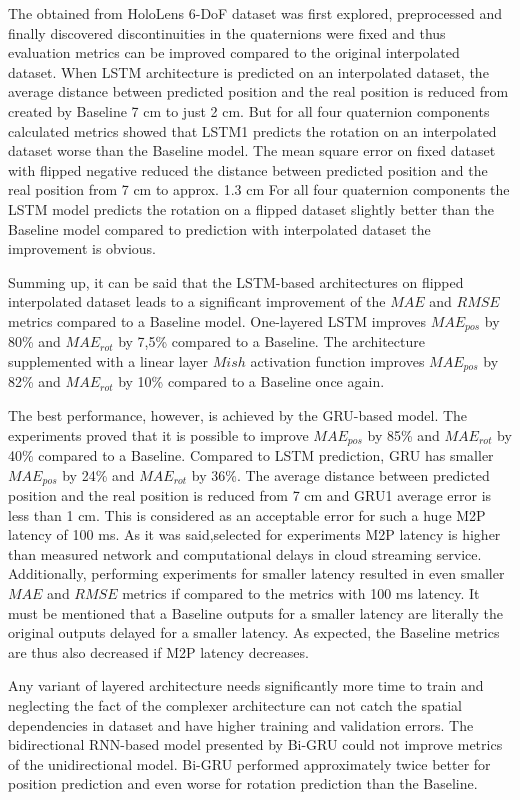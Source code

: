 The obtained from HoloLens 6-DoF dataset was first explored, preprocessed and finally discovered discontinuities in the quaternions were fixed and thus evaluation metrics can be improved compared to the original interpolated dataset. When LSTM architecture is predicted on an interpolated dataset, the average distance between predicted position and the real position is reduced from created by Baseline 7 cm to just 2 cm. But for all four quaternion components calculated metrics showed that LSTM1 predicts the rotation on an interpolated dataset worse than the Baseline model. The mean square error on fixed dataset with flipped negative reduced the distance between predicted position and the real position from 7 cm to approx. 1.3 cm For all four quaternion components the LSTM model predicts the rotation on a flipped dataset slightly better than the Baseline model compared to prediction with interpolated dataset the improvement is obvious. 

Summing up, it can be said that the LSTM-based architectures on flipped interpolated dataset leads to a significant improvement of the $MAE$ and $RMSE$ metrics compared to a Baseline model. One-layered LSTM improves $MAE_{pos}$ by 80\% and $MAE_{rot}$ by 7,5\% compared to a Baseline. The architecture supplemented with a linear layer $Mish$ activation function improves $MAE_{pos}$ by 82\% and $MAE_{rot}$ by 10\% compared to a Baseline once again.

The best performance, however, is achieved by the GRU-based model. The experiments proved that it is possible to improve $MAE_{pos}$ by 85\% and $MAE_{rot}$ by 40\% compared to a Baseline. Compared to LSTM prediction, GRU has smaller $MAE_{pos}$ by 24\% and $MAE_{rot}$ by 36\%. The average distance between predicted position and the real position is reduced from 7 cm and GRU1 average error is less than 1 cm. This is considered as an acceptable error for such a huge M2P latency of 100 ms. As it was said,selected for experiments M2P latency is higher than measured network and computational delays in cloud streaming service. Additionally, performing experiments for smaller latency resulted in even smaller $MAE$ and $RMSE$ metrics if compared to the metrics with 100 ms latency. It must be mentioned that a Baseline outputs for a smaller latency are literally the original outputs delayed for a smaller latency. As expected, the Baseline metrics are thus also decreased if M2P latency decreases. 

Any variant of layered architecture needs significantly more time to train and neglecting the fact of the complexer architecture can not catch the spatial dependencies in dataset and have higher training and validation errors. The bidirectional RNN-based model presented by Bi-GRU could not improve metrics of the unidirectional model. Bi-GRU performed approximately twice better for position prediction and even worse for rotation prediction than the Baseline.

